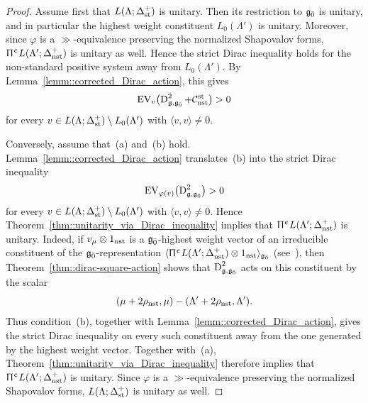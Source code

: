 \begin{proof}
Assume first that $L(\Lambda;\Delta_{{\text{st}}}^{+})$ is unitary. Then its restriction to ${\mathfrak{g}_{\bar{0}}}$ is unitary, and in particular the highest weight constituent $L_0(\Lambda')$ is unitary. Moreover, since $\varphi$ is a $\gg$-equivalence preserving the normalized Shapovalov forms, $ \Uppi^{\upepsilon}L(\Lambda';\Delta_{{\text{nst}}}^{+})$ is unitary as well. Hence the strict Dirac inequality holds for the non-standard positive system away from $L_0(\Lambda')$. By Lemma~\ref{lemm::corrected_Dirac_action}, this gives
\begin{equation*}
{\text{EV}}_v\bigl(\operatorname{D}_{{\mathfrak{g}},{\mathfrak{g}_{\bar{0}}}}^{2}+\mathcal C_{{\text{nst}}}^{{\text{st}}}\bigr)>0
\end{equation*}
for every $v\in L(\Lambda;\Delta_{{\text{st}}}^{+})\setminus L_0(\Lambda')$ with $\langle v,v\rangle\neq0$.

Conversely, assume that~(a) and~(b) hold. Lemma~\ref{lemm::corrected_Dirac_action} translates~(b) into the strict Dirac inequality
\begin{equation*}
{\text{EV}}_{\varphi(v)}\bigl(\operatorname{D}_{{\mathfrak{g}},{\mathfrak{g}_{\bar{0}}}}^{2}\bigr)>0
\end{equation*}
for every $v\in L(\Lambda;\Delta_{{\text{st}}}^{+})\setminus L_0(\Lambda')$ with $\langle v,v\rangle\neq0$. Hence Theorem~\ref{thm::unitarity_via_Dirac_inequality} implies that $ \Uppi^{\upepsilon}L(\Lambda';\Delta_{{\text{nst}}}^{+})$ is unitary. Indeed, if $v_{\mu}\otimes1_{{\text{nst}}}$ is a ${\mathfrak{g}_{\bar{0}}}$-highest weight vector of an irreducible constituent of the ${\mathfrak{g}_{\bar{0}}}$-representation $\langle \Uppi^{\upepsilon}L(\Lambda';\Delta_{{\text{nst}}}^{+})\otimes1_{{\text{nst}}}\rangle_{{\mathfrak{g}_{\bar{0}}}}$ (see~\cite{SchmidtDirac}), then Theorem~\ref{thm::dirac-square-action} shows that $\operatorname{D}_{{\mathfrak{g}},{\mathfrak{g}_{\bar{0}}}}^{2}$ acts on this constituent by the scalar
\begin{equation*}
(\mu+2\rho_{{\text{nst}}},\mu)-(\Lambda'+2\rho_{{\text{nst}}},\Lambda').
\end{equation*}
Thus condition~(b), together with Lemma~\ref{lemm::corrected_Dirac_action}, gives the strict Dirac inequality on every such constituent away from the one generated by the highest weight vector. Together with~(a), Theorem~\ref{thm::unitarity_via_Dirac_inequality} therefore implies that $ \Uppi^{\upepsilon}L(\Lambda';\Delta_{{\text{nst}}}^{+})$ is unitary. Since $\varphi$ is a $\gg$-equivalence preserving the normalized Shapovalov forms, $L(\Lambda;\Delta_{{\text{st}}}^{+})$ is unitary as well. 
\end{proof}

